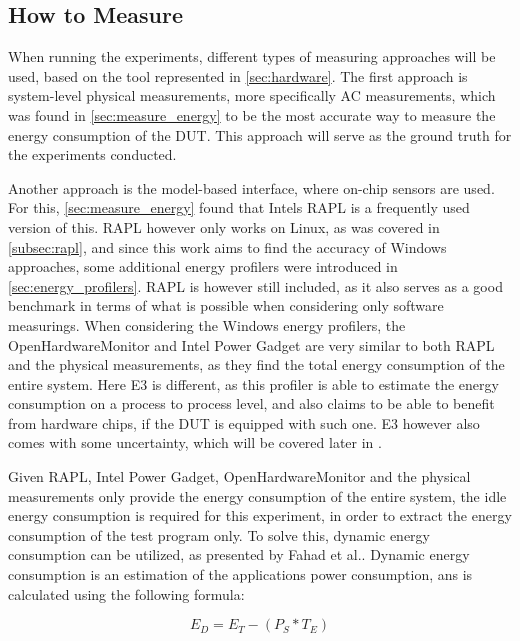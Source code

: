 \subsection{How to Measure}

When running the experiments, different types of measuring approaches will be used, based on the tool represented in \cref*{sec:hardware}. The first approach is system-level physical measurements, more specifically AC measurements, which was found in \cref*{sec:measure_energy} to be the most accurate way to measure the energy consumption of the DUT. This approach will serve as the ground truth for the experiments conducted.

Another approach is the model-based interface, where on-chip sensors are used. For this, \cref*{sec:measure_energy} found that Intels RAPL is a frequently used version of this. RAPL however only works on Linux, as was covered in \cref*{subsec:rapl}, and since this work aims to find the accuracy of Windows approaches, some additional energy profilers were introduced in \cref*{sec:energy_profilers}. RAPL is however still included, as it also serves as a good benchmark in terms of what is possible when considering only software measurings. When considering the Windows energy profilers, the OpenHardwareMonitor and Intel Power Gadget are very similar to both RAPL and the physical measurements, as they find the total energy consumption of the entire system. Here E3 is different, as this profiler is able to estimate the energy consumption on a process to process level, and also claims to be able to benefit from hardware chips, if the DUT is equipped with such one. E3 however also comes with some uncertainty, which will be covered later in .

Given RAPL, Intel Power Gadget, OpenHardwareMonitor and the physical measurements only provide the energy consumption of the entire system, the idle energy consumption is required for this experiment, in order to extract the energy consumption of the test program only. To solve this, dynamic energy consumption can be utilized, as presented by Fahad et al.\cite*[]{fahad2019comparative}. Dynamic energy consumption is an estimation of the applications power consumption, ans is calculated using the following formula:

\begin{equation}
    E_D = E_T -(P_S * T_E)
\end{equation}

